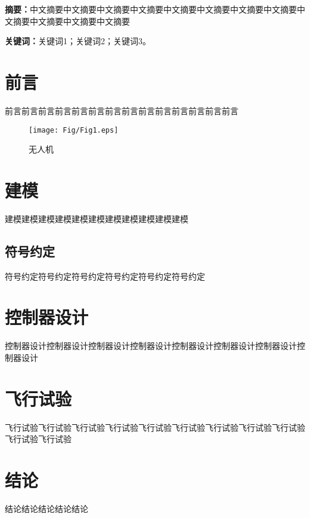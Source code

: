 





\textbf{摘要：}中文摘要中文摘要中文摘要中文摘要中文摘要中文摘要中文摘要中文摘要中文摘要中文摘要中文摘要中文摘要

\textbf{关键词：}关键词1；关键词2；关键词3。


\setlength{\parindent}{2em} 
\section{前言}
\label{intro}
前言前言前言前言前言前言前言前言前言前言前言前言前言前言
\begin{figure}[!h]
	\centering
	\texttt{[image: Fig/Fig1.eps]}
	\caption{无人机}
	\label{fig:1}     
\end{figure}
\section{建模}
\label{sec:1}
建模建模建模建模建模建模建模建模建模建模建模

\subsection{符号约定}
符号约定符号约定符号约定符号约定符号约定符号约定

\section{控制器设计}
控制器设计控制器设计控制器设计控制器设计控制器设计控制器设计控制器设计控制器设计

\section{飞行试验}
飞行试验飞行试验飞行试验飞行试验飞行试验飞行试验飞行试验飞行试验飞行试验飞行试验飞行试验	\cite{RN39}
\section{结论}
结论结论结论结论结论
